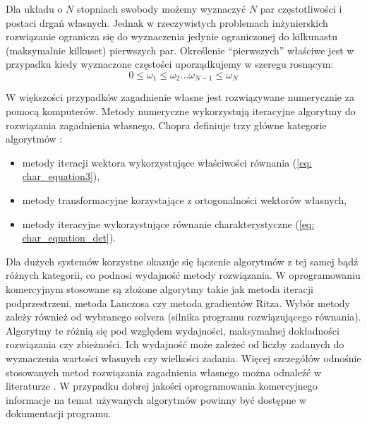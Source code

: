 Dla układu o $N$ stopniach swobody możemy wyznaczyć $N$ par częstotliwości i postaci drgań własnych. Jednak w rzeczywistych problemach inżynierskich rozwiązanie ogranicza się do wyznaczenia jedynie ograniczonej do kilkunastu (maksymalnie kilkuset) pierwszych par. Określenie \enquote{pierwszych} właściwe jest w przypadku kiedy wyznaczone częstości uporządkujemy w szeregu rosnącym:
\begin{equation} \label{eq: eigenvalues_list}
0 \leq \omega_1  \leq \omega_2 \dots  \omega_{N-1} \leq  \omega_N
\end{equation}

W większości przypadków zagadnienie własne jest rozwiązywane numerycznie za pomocą komputerów. Metody numeryczne wykorzystują iteracyjne algorytmy do rozwiązania zagadnienia własnego. Chopra  definiuje trzy główne kategorie algorytmów \cite{Chopra2012a}: 
\begin{itemize}
	\item metody iteracji wektora wykorzystujące właściwości równania (\ref{eq: char_equation3}),
	\item metody transformacyjne korzystające z ortogonalności wektorów własnych,
	\item metody iteracyjne wykorzystujące równanie charakterystyczne (\ref{eq: char_equation_det}).
\end{itemize}
Dla dużych systemów korzystne okazuje się łączenie algorytmów z tej samej bądź różnych kategorii, co podnosi wydajność metody rozwiązania. W oprogramowaniu komercyjnym stosowane są złożone algorytmy takie jak metoda iteracji podprzestrzeni, metoda Lanczosa czy metoda gradientów Ritza. Wybór metody zależy również od wybranego solvera (silnika programu rozwiązującego równania). Algorytmy te różnią się pod względem wydajności, maksymalnej dokładności rozwiązania czy zbieżności. Ich wydajność może zależeć od liczby zadanych do wyznaczenia wartości własnych czy wielkości zadania. Więcej szczegółów odnośnie stosowanych metod rozwiązania zagadnienia własnego można odnaleźć w literaturze \parencite{Hughes1987,Chopra2012a,Bathe2006,Wilson1983,Wilson1997,Fialko2000,Papadrakakis1993}. W przypadku dobrej jakości oprogramowania komercyjnego informacje na temat używanych algorytmów powinny być dostępne w dokumentacji programu.

